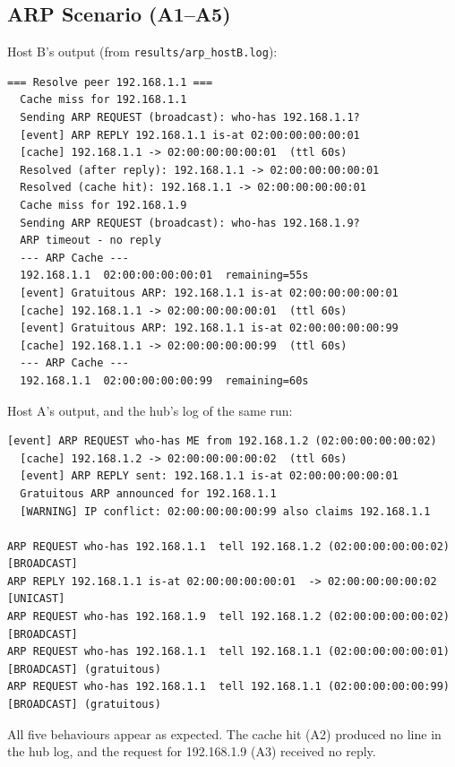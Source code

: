 \documentclass[11pt]{article}
\begin{document}
\subsection{ARP Scenario (A1--A5)}
Host B's output (from \texttt{results/arp\_hostB.log}):
\begin{lstlisting}[style=log]
=== Resolve peer 192.168.1.1 ===
  Cache miss for 192.168.1.1
  Sending ARP REQUEST (broadcast): who-has 192.168.1.1?
  [event] ARP REPLY 192.168.1.1 is-at 02:00:00:00:00:01
  [cache] 192.168.1.1 -> 02:00:00:00:00:01  (ttl 60s)
  Resolved (after reply): 192.168.1.1 -> 02:00:00:00:00:01
  Resolved (cache hit): 192.168.1.1 -> 02:00:00:00:00:01
  Cache miss for 192.168.1.9
  Sending ARP REQUEST (broadcast): who-has 192.168.1.9?
  ARP timeout - no reply
  --- ARP Cache ---
  192.168.1.1  02:00:00:00:00:01  remaining=55s
  [event] Gratuitous ARP: 192.168.1.1 is-at 02:00:00:00:00:01
  [cache] 192.168.1.1 -> 02:00:00:00:00:01  (ttl 60s)
  [event] Gratuitous ARP: 192.168.1.1 is-at 02:00:00:00:00:99
  [cache] 192.168.1.1 -> 02:00:00:00:00:99  (ttl 60s)
  --- ARP Cache ---
  192.168.1.1  02:00:00:00:00:99  remaining=60s
\end{lstlisting}
Host A's output, and the hub's log of the same run:
\begin{lstlisting}[style=log]
  [event] ARP REQUEST who-has ME from 192.168.1.2 (02:00:00:00:00:02)
  [cache] 192.168.1.2 -> 02:00:00:00:00:02  (ttl 60s)
  [event] ARP REPLY sent: 192.168.1.1 is-at 02:00:00:00:00:01
  Gratuitous ARP announced for 192.168.1.1
  [WARNING] IP conflict: 02:00:00:00:00:99 also claims 192.168.1.1

ARP REQUEST who-has 192.168.1.1  tell 192.168.1.2 (02:00:00:00:00:02)  [BROADCAST]
ARP REPLY 192.168.1.1 is-at 02:00:00:00:00:01  -> 02:00:00:00:00:02  [UNICAST]
ARP REQUEST who-has 192.168.1.9  tell 192.168.1.2 (02:00:00:00:00:02)  [BROADCAST]
ARP REQUEST who-has 192.168.1.1  tell 192.168.1.1 (02:00:00:00:00:01)  [BROADCAST] (gratuitous)
ARP REQUEST who-has 192.168.1.1  tell 192.168.1.1 (02:00:00:00:00:99)  [BROADCAST] (gratuitous)
\end{lstlisting}
All five behaviours appear as expected. The cache hit (A2) produced no line in the hub
log, and the request for 192.168.1.9 (A3) received no reply.
\end{document}
